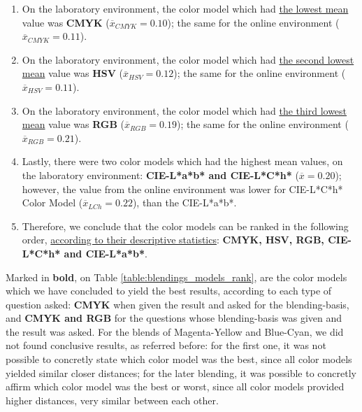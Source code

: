\begin{enumerate}
  \item On the laboratory environment, the color model which had \ul{the lowest mean} value was \textbf{CMYK} ($\overline{x}_{CMYK} = 0.10$); the same for the online environment ($\overline{x}_{CMYK} = 0.11$).
  \item On the laboratory environment, the color model which had \ul{the second lowest mean} value was \textbf{HSV} ($\overline{x}_{HSV} = 0.12$); the same for the online environment ($\overline{x}_{HSV} = 0.11$).
  \item On the laboratory environment, the color model which had \ul{the third lowest mean} value was \textbf{RGB} ($\overline{x}_{RGB} = 0.19$); the same for the online environment ($\overline{x}_{RGB} = 0.21$).
  \item Lastly, there were two color models which had the highest mean values, on the laboratory environment: \textbf{CIE-L*a*b* and CIE-L*C*h*} ($\overline{x} = 0.20$); however, the value from the online environment
  was lower for CIE-L*C*h* Color Model ($\overline{x}_{LCh} = 0.22$), than the CIE-L*a*b*.
  \item Therefore, we conclude that the color models can be ranked in the following order, \ul{according to their descriptive statistics}: \textbf{CMYK, HSV, RGB, CIE-L*C*h* and CIE-L*a*b*}.
\end{enumerate}
%
Marked in \textbf{bold}, on Table \ref{table:blendings_models_rank}, are the color models which we have concluded to yield the best results, according to each type of question asked: \textbf{CMYK} when given the
result and asked for the blending-basis, and \textbf{CMYK and RGB} for the questions whose blending-basis was given and the result was asked. For the blends of Magenta-Yellow and Blue-Cyan, we did not found
conclusive results, as referred before: for the first one, it was not possible to concretly state which color model was the best, since all color models yielded similar closer distances; for the later blending, it was possible
to concretly affirm which color model was the best or worst, since all color models provided higher distances, very similar between each other.
%
